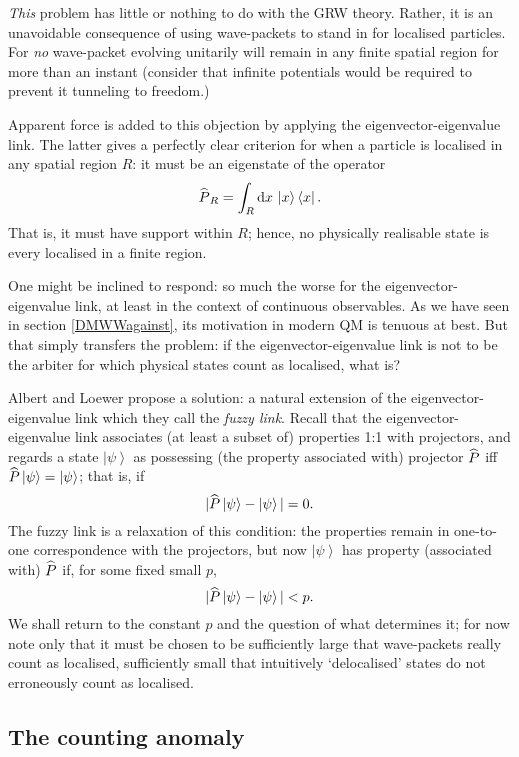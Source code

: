 \documentclass[12pt]{article}
\newcommand{\be}{\begin{equation}}
\newcommand{\ee}{\end{equation}}
\newcommand{\dr}[1]{\ensuremath{\mathrm{d} #1\,}}
\newcommand{\ket}[1]{\ensuremath{\left|  #1 \right\rangle}}
\newcommand{\bra}[1]{\ensuremath{\left\langle #1 \right|}}
\newcommand{\proj}[2]{\ensuremath{\ket{#1} \bra{#2}}}
\newcommand{\op}[1]{\ensuremath{\widehat{\textsf{\ensuremath{#1}}}}}
\begin{document}
\emph{This} problem has little or nothing to do with the GRW theory. Rather, it is an unavoidable consequence of using wave-packets to stand in for localised particles. For \emph{no} wave-packet evolving unitarily will remain in any finite spatial region for more than an instant (consider that infinite potentials would be required to prevent it tunneling to freedom.) 

Apparent force is added to this objection by applying the eigenvector-eigenvalue link. The latter gives a perfectly clear criterion for when a particle is localised in any spatial region $R$: it must be an eigenstate of the operator 
\be\op{P}_R=\int_R \dr{x}\proj{x}{x}.\ee
That is, it must have support within $R$; hence, no physically realisable state is every localised in a finite region.

One might be inclined to respond: so much the worse for the eigenvector-eigenvalue link, at least in the context of continuous observables. As we have seen in section \ref{DMWWagainst}, its motivation in modern QM is tenuous at best. But that simply transfers the problem: if the eigenvector-eigenvalue link is not to be the arbiter for which physical states count as localised, what is?

Albert and Loewer propose a solution: a natural extension of the eigenvector-eigenvalue link which they call the \emph{fuzzy link}. Recall that  the eigenvector-eigenvalue link associates (at least a subset of) properties 1:1 with projectors, and regards a state \ket{\psi} as possessing (the property associated with) projector \op{P} iff $\op{P}\ket{\psi}=\ket{\psi}$; that is, if
\be|\op{P}\ket{\psi}-\ket{\psi}|=0.\ee
The fuzzy link is a relaxation of this condition: the properties remain in one-to-one correspondence with the projectors, but now \ket{\psi} has property (associated with) \op{P} if, for some fixed small $p$,
\be\label{DMWWfuzzylink}|\op{P}\ket{\psi}-\ket{\psi}|<p.\ee
We shall return to the constant $p$ and the question of what determines it; for now note only that it must be chosen to be sufficiently large that wave-packets really count as localised, sufficiently small that intuitively `delocalised' states do not erroneously count as localised.

\subsection{The counting anomaly}\label{DMWWcounting}
\end{document}
